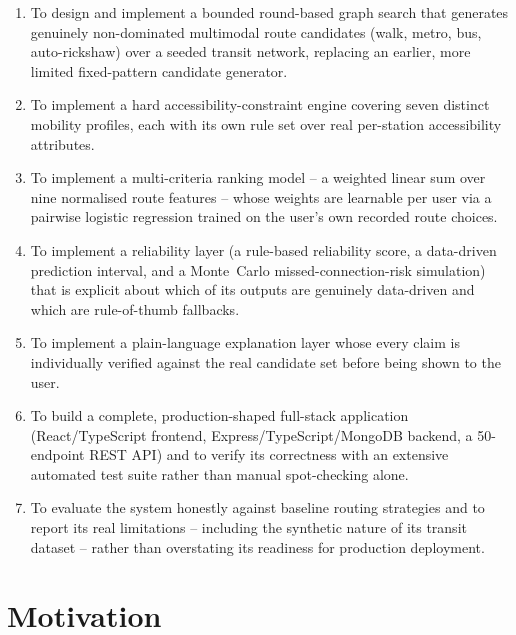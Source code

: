 \documentclass[12pt,a4paper]{report}
\begin{document}
\begin{enumerate}[leftmargin=*]
  \item To design and implement a bounded round-based graph search that generates genuinely
    non-dominated multimodal route candidates (walk, metro, bus, auto-rickshaw) over a seeded
    transit network, replacing an earlier, more limited fixed-pattern candidate generator.
  \item To implement a hard accessibility-constraint engine covering seven distinct mobility
    profiles, each with its own rule set over real per-station accessibility attributes.
  \item To implement a multi-criteria ranking model -- a weighted linear sum over nine normalised
    route features -- whose weights are learnable per user via a pairwise logistic regression
    trained on the user's own recorded route choices.
  \item To implement a reliability layer (a rule-based reliability score, a data-driven prediction
    interval, and a Monte~Carlo missed-connection-risk simulation) that is explicit about which of
    its outputs are genuinely data-driven and which are rule-of-thumb fallbacks.
  \item To implement a plain-language explanation layer whose every claim is individually verified
    against the real candidate set before being shown to the user.
  \item To build a complete, production-shaped full-stack application (React/TypeScript frontend,
    Express/TypeScript/MongoDB backend, a 50-endpoint REST API) and to verify its correctness with
    an extensive automated test suite rather than manual spot-checking alone.
  \item To evaluate the system honestly against baseline routing strategies and to report its real
    limitations -- including the synthetic nature of its transit dataset -- rather than overstating
    its readiness for production deployment.
\end{enumerate}

\section{Motivation}
\end{document}
